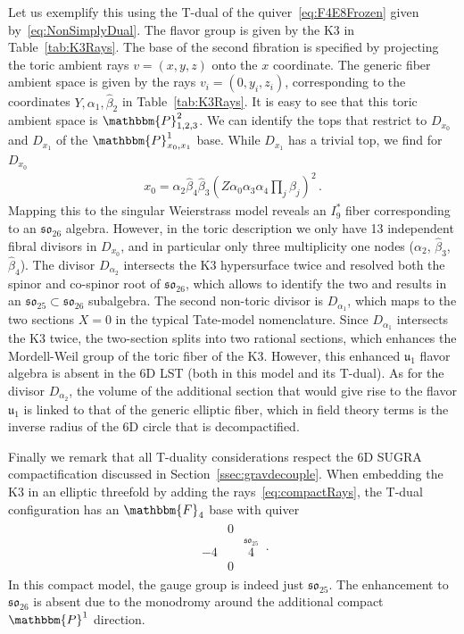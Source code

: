 \documentclass[11pt]{article}
\numberwithin{equation}{section}
\newcommand{\fu}{\mathfrak{u}}
\newcommand{\fso}{\mathfrak{so}}
\begin{document}
Let us exemplify this using the T-dual of the quiver~\eqref{eq:F4E8Frozen} given by~\eqref{eq:NonSimplyDual}. The flavor group is given by the K3 in Table~\ref{tab:K3Rays}. The base of the second fibration is specified by projecting the toric ambient rays $v=(x,y,z)$ onto the $x$ coordinate. The generic fiber ambient space is given by the rays $v_i=(0,y_i,z_i)$, corresponding to the coordinates $Y, \alpha_1, \hat{\beta}_2$ in Table~\ref{tab:K3Rays}. It is easy to see that this toric ambient space is $\mathbbm{P}^2_{1,2,3}$. We can identify the tops that restrict to $D_{x_0}$ and $D_{x_1}$ of the $\mathbbm{P}^1_{x_0,x_1}$ base. While $D_{x_1}$ has a trivial top, we find for $D_{x_0}$
\begin{align}
    x_0 =  \alpha_2 \hat{\beta}_4 \hat{\beta}_3 \left(Z \alpha_0  \alpha_3 \alpha_4 \prod_{j} \beta_j\right)^2 \, .
\end{align} 
Mapping this to the singular Weierstrass model reveals an $I_9^*$ fiber corresponding to an $\fso_{26}$ algebra. However, in the toric description we only have 13 independent fibral divisors in $D_{x_0}$, and in particular only three multiplicity one nodes ($\alpha_2$, $\hat{\beta}_3 $, $\hat{\beta}_4$). The divisor $D_{\alpha_2}$ intersects the K3 hypersurface twice and resolved
both the spinor and co-spinor root of $\fso_{26}$, which allows to identify the two and results in an $\fso_{25}\subset \fso_{26}$ subalgebra. The second non-toric divisor is $D_{\alpha_1}$, which maps to the two sections $X=0$ in the typical Tate-model nomenclature. Since $D_{\alpha_1}$ intersects the K3 twice, the two-section splits into two rational sections, which enhances the Mordell-Weil group of the toric fiber of the K3. However, this enhanced $\fu_1$ flavor algebra is absent in the 6D LST (both in this model and its T-dual). As for the divisor $D_{\alpha_2}$, the volume of the additional section that would give rise to the flavor $\fu_1$ is linked to that of the generic elliptic fiber, which in field theory terms is the inverse radius of the 6D circle that is decompactified.   

Finally we remark that all T-duality considerations respect the 6D SUGRA compactification discussed in Section~\ref{ssec:gravdecouple}. When embedding the K3 in an elliptic threefold by adding the rays~\eqref{eq:compactRays}, the T-dual configuration has an $\mathbbm{F}_4$ base with quiver 
\begin{align}
\begin{array}{ccc}
&0&\\
\overset{  }{-4}&&\overset{\fso_{25}}{4}\\
&0&
\end{array}\, .
\end{align} 
In this compact model, the gauge group is indeed just $\fso_{25}$. The enhancement to $\fso_{26}$ is absent due to the monodromy around the additional compact $\mathbbm{P}^1$ direction.
\end{document}
